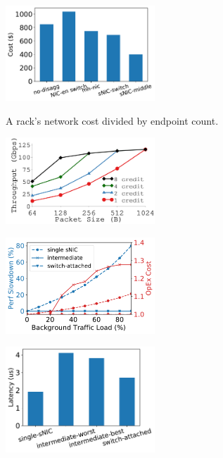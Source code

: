 {
\begin{figure}[t]
\begin{center}
\centerline{\includegraphics[width=0.5\textwidth]{snic/Figures/fig-single-rack-capex-perDevCost.pdf}}
{
A rack's network cost divided by endpoint count. 
}
\end{center}
\end{figure}
}
{
\begin{figure}[h]
\begin{center}
\centerline{\includegraphics[width=0.5\textwidth]{snic/Figures/g_plot_credit.pdf}}
{
}
\end{center}
\end{figure}
}
{
\begin{figure}[h]
\begin{center}
\centerline{\includegraphics[width=0.5\textwidth]{snic/Figures/fig-dist-nic-load-increase.pdf}}
{
}
\end{center}
\end{figure}
}
{
\begin{figure}[h]
\begin{center}
\centerline{\includegraphics[width=0.5\textwidth]{snic/Figures/fig-dist-nic-latency.pdf}}
{
}
\end{center}
\end{figure}
}